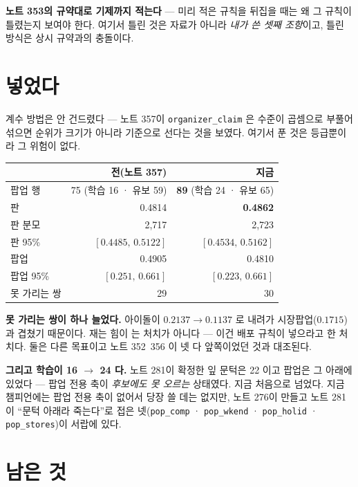 \documentclass[11pt]{article}
\begin{document}
\textbf{노트 353의 규약대로 기제까지 적는다} --- 미리 적은 규칙을 뒤집을
때는 왜 그 규칙이 틀렸는지 보여야 한다. 여기서 틀린 것은 자료가 아니라
\emph{내가 쓴 셋째 조항}이고, 틀린 방식은 상시 규약과의 충돌이다.

\section{넣었다}

계수 방법은 안 건드렸다 --- 노트 357이 \texttt{organizer\_claim} 은 수준이
곱셈으로 부풀어 섞으면 순위가 크기가 아니라 기준으로 선다는 것을 보였다.
여기서 푼 것은 등급뿐이라 그 위험이 없다.

\begin{center}
\begin{tabular}{lrr}
\hline
 & 전(노트 357) & 지금 \\
\hline
팝업 행       & 75 (학습 16 · 유보 59) & \textbf{89} (학습 24 · 유보 65) \\
판           & 0.4814 & \textbf{0.4862} \\
판 분모      & 2,717 & 2,723 \\
판 95\%      & $[0.4485,\,0.5122]$ & $[0.4534,\,0.5162]$ \\
팝업         & 0.4905 & 0.4810 \\
팝업 95\%    & $[0.251,\,0.661]$ & $[0.223,\,0.661]$ \\
못 가리는 쌍 & 29 & 30 \\
\hline
\end{tabular}
\end{center}

\textbf{못 가리는 쌍이 하나 늘었다.} 아이돌이 $0.2137 \to 0.1137$ 로
내려가 시장팝업($0.1715$)과 겹쳤기 때문이다. 재는 힘이 는 처치가 아니다 ---
이건 배포 규칙이 넣으라고 한 처치다. 둘은 다른 목표이고 노트 352~356 이
넷 다 앞쪽이었던 것과 대조된다.

\textbf{그리고 학습이 16 $\to$ 24 다.} 노트 281이 확정한 잎 문턱은 22 이고
팝업은 그 아래에 있었다 --- 팝업 전용 축이 \emph{후보에도 못 오르는}
상태였다. 지금 처음으로 넘었다. 지금 챔피언에는 팝업 전용 축이 없어서
당장 쓸 데는 없지만, 노트 276이 만들고 노트 281이 ``문턱 아래라 죽는다''로
접은 넷(\texttt{pop\_comp} · \texttt{pop\_wkend} · \texttt{pop\_holid} ·
\texttt{pop\_stores})이 서랍에 있다.

\section{남은 것}
\end{document}
